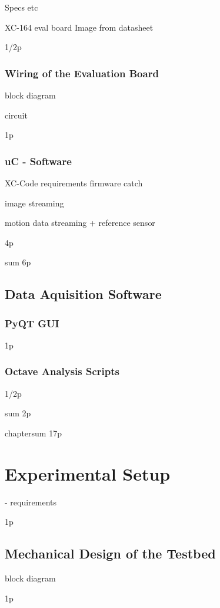 \documentclass[12pt,a4paper]{article}
\begin{document}
Specs etc

XC-164 eval board 
  Image from datasheet

1/2p

\subsubsection{Wiring of the Evaluation Board}

  block diagram

  circuit

1p

\subsubsection{uC - Software}

  XC-Code
    requirements
    firmware catch

    image streaming

    motion data streaming
      + reference sensor

4p

sum 6p


\subsection{Data Aquisition Software}

\subsubsection{PyQT GUI}
1p

\subsubsection{Octave Analysis Scripts}
1/2p


sum 2p

chaptersum 17p

\section{Experimental Setup}

- requirements

1p

\subsection{Mechanical Design of the Testbed}

block diagram

1p
\end{document}
